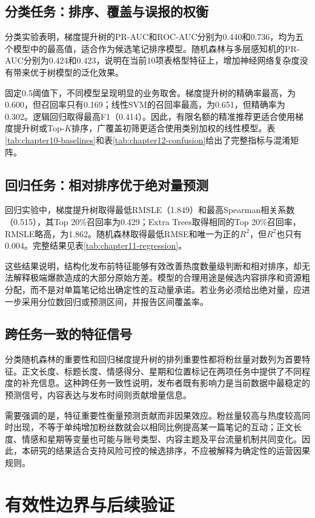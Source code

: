 \section{分类任务：排序、覆盖与误报的权衡}
分类实验表明，梯度提升树的PR-AUC和ROC-AUC分别为0.440和0.736，均为五个模型中的最高值，适合作为候选笔记排序模型。随机森林与多层感知机的PR-AUC分别为0.424和0.423，说明在当前10项表格型特征上，增加神经网络复杂度没有带来优于树模型的泛化效果。

固定0.5阈值下，不同模型呈现明显的业务取舍。梯度提升树的精确率最高，为0.600，但召回率只有0.169；线性SVM的召回率最高，为0.651，但精确率为0.302。逻辑回归取得最高F1（0.414）。因此，有限名额的精准推荐更适合使用梯度提升树或Top-$K$排序，广覆盖初筛更适合使用类别加权的线性模型。表\ref{tab:chapter10-baselines}和表\ref{tab:chapter12-confusion}给出了完整指标与混淆矩阵。

\section{回归任务：相对排序优于绝对量预测}
回归实验中，梯度提升树取得最低RMSLE（1.849）和最高Spearman相关系数（0.515），其Top 20\%召回率为0.429；Extra Trees取得相同的Top 20\%召回率，RMSLE略高，为1.862。随机森林取得最低RMSE和唯一为正的$R^2$，但$R^2$也只有0.004。完整结果见表\ref{tab:chapter11-regression}。

这些结果说明，结构化发布前特征能够有效改善热度数量级判断和相对排序，却无法解释极端爆款造成的大部分原始方差。模型的合理用途是候选内容排序和资源粗分配，而不是对单篇笔记给出确定性的互动量承诺。若业务必须给出绝对量，应进一步采用分位数回归或预测区间，并报告区间覆盖率。

\section{跨任务一致的特征信号}
分类随机森林的重要性和回归梯度提升树的排列重要性都将粉丝量对数列为首要特征。正文长度、标题长度、情感得分、星期和位置标记在两项任务中提供了不同程度的补充信息。这种跨任务一致性说明，发布者既有影响力是当前数据中最稳定的预测信号，内容表达与发布时间则贡献增量信息。

需要强调的是，特征重要性衡量预测贡献而非因果效应。粉丝量较高与热度较高同时出现，不等于单纯增加粉丝数就会以相同比例提高某一篇笔记的互动；正文长度、情感和星期等变量也可能与账号类型、内容主题及平台流量机制共同变化。因此，本研究的结果适合支持风险可控的候选排序，不应被解释为确定性的运营因果规则。

\chapter{有效性边界与后续验证}

